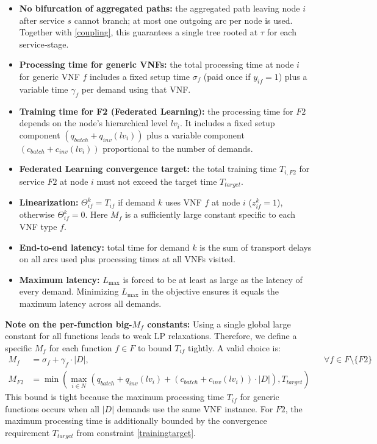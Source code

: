\documentclass{article}
\begin{document}
\begin{itemize}
    \item[\eqref{nobifurc}] \textbf{No bifurcation of aggregated paths:} the aggregated path leaving node $i$ after service $s$ cannot branch; at most one outgoing arc per node is used. Together with \eqref{coupling}, this guarantees a single tree rooted at $\tau$ for each service‑stage.
    \item[\eqref{proctime_other}] \textbf{Processing time for generic VNFs:} the total processing time at node $i$ for generic VNF $f$ includes a fixed setup time $\sigma_f$ (paid once if $y_{if}=1$) plus a variable time $\gamma_f$ per demand using that VNF.
    \item[\eqref{proctime_F2}] \textbf{Training time for F2 (Federated Learning):} the processing time for $F2$ depends on the node's hierarchical level $lv_i$. It includes a fixed setup component $\left(q_{batch} + q_{inv}(lv_i)\right)$ plus a variable component $\left(c_{batch} + c_{inv}(lv_i)\right)$ proportional to the number of demands.
    \item[\eqref{trainingtarget}] \textbf{Federated Learning convergence target:} the total training time $T_{i,F2}$ for service $F2$ at node $i$ must not exceed the target time $T_{target}$.
    \item[\eqref{theta1}--\eqref{theta2}] \textbf{Linearization:} $\Theta_{if}^k = T_{if}$ if demand $k$ uses VNF $f$ at node $i$ ($z_{if}^k=1$), otherwise $\Theta_{if}^k = 0$. Here $M_f$ is a sufficiently large constant specific to each VNF type $f$.
    \item[\eqref{latency}] \textbf{End-to-end latency:} total time for demand $k$ is the sum of transport delays on all arcs used plus processing times at all VNFs visited.
    \item[\eqref{maxlatency}] \textbf{Maximum latency:} $L_{\max}$ is forced to be at least as large as the latency of every demand. Minimizing $L_{\max}$ in the objective ensures it equals the maximum latency across all demands.
\end{itemize}

\vspace{1em}
\noindent\textbf{Note on the per-function big-$M_f$ constants:} 
Using a single global large constant for all functions leads to weak LP relaxations. Therefore, we define a specific $M_f$ for each function $f \in F$ to bound $T_{if}$ tightly. A valid choice is:
\begin{align*}
    M_f &= \sigma_f + \gamma_f \cdot |D|, \quad &&\forall f \in F \setminus \{F2\} \\
    M_{F2} &= \min \left( \max_{i \in N} \left( q_{batch} + q_{inv}(lv_i) + (c_{batch} + c_{inv}(lv_i)) \cdot |D| \right), T_{target} \right)
\end{align*}
This bound is tight because the maximum processing time $T_{if}$ for generic functions occurs when all $|D|$ demands use the same VNF instance. For $F2$, the maximum processing time is additionally bounded by the convergence requirement $T_{target}$ from constraint \eqref{trainingtarget}.
\end{document}
